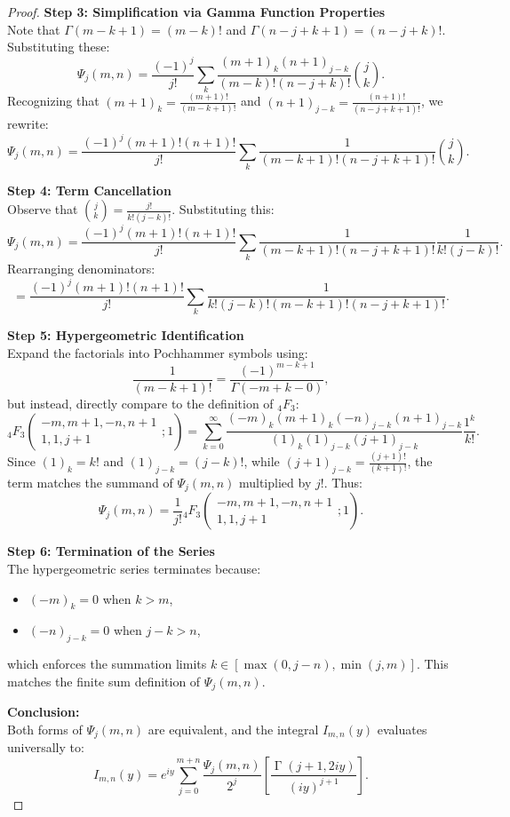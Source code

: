 \documentclass[12pt]{article}
\DeclareMathOperator{\gamma}{\Gamma}
\begin{document}
\begin{proof}
\textbf{Step 3: Simplification via Gamma Function Properties}\\[1mm]
Note that $\Gamma(m - k + 1) = (m - k)!$ and $\Gamma(n - j + k + 1) = (n - j + k)!$. Substituting these:
\[
\Psi_j(m,n) = \frac{(-1)^j}{j!} \sum_{k} \frac{(m+1)_k (n+1)_{j-k}}{(m - k)! (n - j + k)!} \binom{j}{k}.
\]
Recognizing that $(m+1)_k = \frac{(m+1)!}{(m - k + 1)!}$ and $(n+1)_{j-k} = \frac{(n+1)!}{(n - j + k + 1)!}$, we rewrite:
\[
\Psi_j(m,n) = \frac{(-1)^j (m+1)! (n+1)!}{j!} \sum_{k} \frac{1}{(m - k + 1)! (n - j + k + 1)!} \binom{j}{k}.
\]

\textbf{Step 4: Term Cancellation}\\[1mm]
Observe that $\binom{j}{k} = \frac{j!}{k! (j - k)!}$. Substituting this:
\[
\Psi_j(m,n) = \frac{(-1)^j (m+1)! (n+1)!}{j!} \sum_{k} \frac{1}{(m - k + 1)! (n - j + k + 1)!} \frac{1}{k! (j - k)!}.
\]
Rearranging denominators:
\[
= \frac{(-1)^j (m+1)! (n+1)!}{j!} \sum_{k} \frac{1}{k! (j - k)! (m - k + 1)! (n - j + k + 1)!}.
\]

\textbf{Step 5: Hypergeometric Identification}\\[1mm]
Expand the factorials into Pochhammer symbols using:
\[
\frac{1}{(m - k + 1)!} = \frac{(-1)^{m - k + 1}}{\Gamma(-m + k - 0)},
\]
but instead, directly compare to the definition of ${}_4F_3$:
\[
{}_4F_3\left(\begin{matrix} -m, m+1, -n, n+1 \\ 1, 1, j+1 \end{matrix}; 1\right) = \sum_{k=0}^\infty \frac{(-m)_k (m+1)_k (-n)_{j-k} (n+1)_{j-k}}{(1)_k (1)_{j-k} (j+1)_{j-k}} \frac{1^k}{k!}.
\]
Since $(1)_k = k!$ and $(1)_{j-k} = (j - k)!$, while $(j+1)_{j-k} = \frac{(j+1)!}{(k + 1)!}$, the term matches the summand of $\Psi_j(m,n)$ multiplied by $j!$. Thus:
\[
\Psi_j(m,n) = \frac{1}{j!} {}_4F_3\left(\begin{matrix} -m, m+1, -n, n+1 \\ 1, 1, j+1 \end{matrix}; 1\right).
\]

\textbf{Step 6: Termination of the Series}\\[1mm]
The hypergeometric series terminates because:
\begin{itemize}
\item $(-m)_k = 0$ when $k > m$,
\item $(-n)_{j - k} = 0$ when $j - k > n$,
\end{itemize}
which enforces the summation limits $k \in [\max(0, j - n), \min(j, m)]$. This matches the finite sum definition of $\Psi_j(m,n)$.

\textbf{Conclusion:}\\[1mm]
Both forms of $\Psi_j(m,n)$ are equivalent, and the integral $I_{m,n}(y)$ evaluates universally to:
\[
I_{m,n}(y) = e^{iy}\sum_{j=0}^{m+n}\frac{\Psi_j(m,n)}{2^j}\left[\frac{\gamma(j+1,2iy)}{(iy)^{j+1}}\right].
\]
\end{proof}
\end{document}
